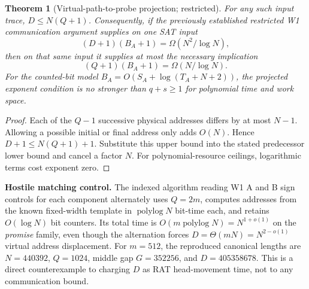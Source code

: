\documentclass[11pt]{article}
\newtheorem{theorem}{Theorem}
\begin{document}
\begin{theorem}[Virtual-path-to-probe projection; restricted]\label{th:proj}
For any such input trace, \(D\le N(Q+1)\).
Consequently, if the previously established restricted W1
communication argument supplies on one SAT input
\[
  (D+1)(B_A+1)=\Omega(N^2/\log N),
\]
then on that same input it supplies at most the necessary implication
\[
  (Q+1)(B_A+1)=\Omega(N/\log N).
\]
For the counted-bit model \(B_A=O(S_A+\log(T_A+N+2))\),
the projected exponent condition is no stronger than
\(q+s\ge1\) for polynomial time and work space.
\end{theorem}
\begin{proof}
Each of the \(Q-1\) successive physical addresses differs by at most
\(N-1\). Allowing a possible initial or final address only adds
\(O(N)\). Hence \(D+1\le N(Q+1)+1\). Substitute this upper bound
into the stated predecessor lower bound and cancel a factor \(N\).
For polynomial-resource ceilings, logarithmic terms cost exponent zero.
\end{proof}

\noindent\textbf{Hostile matching control.}
The indexed algorithm reading W1 A and B sign controls for each
component alternately uses \(Q=2m\), computes addresses from the known
fixed-width template in \(\operatorname{polylog}N\) bit-time each,
and retains \(O(\log N)\) bit counters. Its total time is
\(O(m\operatorname{polylog}N)=N^{1+o(1)}\) on the \emph{promise}
family, even though the alternation forces
\(D=\Theta(mN)=N^{2-o(1)}\) virtual address displacement.
For \(m=512\), the reproduced canonical lengths are
\(N=440392\), \(Q=1024\), middle gap \(G=352256\), and
\(D=405358678\). This is a direct counterexample to charging
\(D\) as RAT head-movement time, not to any communication bound.
\end{document}
